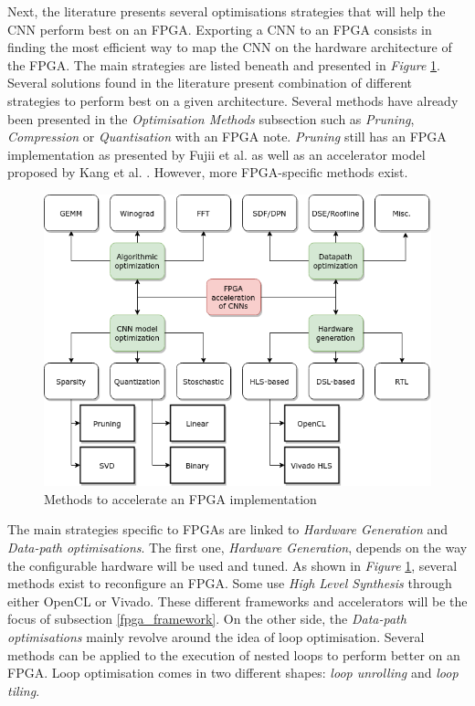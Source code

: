 Next, the literature presents several optimisations strategies that will help the CNN perform best on an FPGA. Exporting a CNN to an FPGA consists in finding the most efficient way to map the CNN on the hardware architecture of the FPGA. The main strategies are listed beneath and presented in \emph{Figure} \ref{fig:InferenceOpt}. Several solutions found in the literature present combination of different strategies to perform best on a given architecture. Several methods have already been presented in the \emph{Optimisation Methods} subsection such as \emph{Pruning}, \emph{Compression} or \emph{Quantisation} with an FPGA note. \emph{Pruning} still has an FPGA implementation as presented by Fujii et al. \cite{Fujii2017} as well as an accelerator model proposed by Kang et al. \cite{Kang2019}. However, more FPGA-specific methods exist.

\begin{figure}[htbp]
	\centering
		\includegraphics[width=.75\textwidth]{Figures/InferenceOpt1.png}
	\caption[Inference Optimisations]{Methods to accelerate an FPGA implementation \cite{Abdelouahab2018}}
	\label{fig:InferenceOpt}
\end{figure}

The main strategies specific to FPGAs are linked to \emph{Hardware Generation} and \emph{Data-path optimisations}. The first one, \emph{Hardware Generation}, depends on the way the configurable hardware will be used and tuned. As shown in \emph{Figure} \ref{fig:InferenceOpt}, several methods exist to reconfigure an FPGA. Some use \emph{High Level Synthesis} through either OpenCL or Vivado. These different frameworks and accelerators will be the focus of subsection \ref{fpga_framework}. On the other side, the \emph{Data-path optimisations} mainly revolve around the idea of loop optimisation. Several methods can be applied to the execution of nested loops to perform better on an FPGA. Loop optimisation comes in two different shapes: \emph{loop unrolling} and \emph{loop tiling}.

